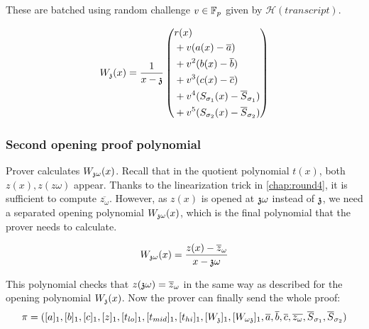 These are batched using random challenge $v \in \mathbb{F}_p$ given by $\mathcal{H}(transcript)$. 

$$W_{\mathfrak{z}}(x) = \frac{1}{x - \mathfrak{z}} \left(
\begin{aligned}
    &r(x)  \\
    &+ v(a(x) - \overline{a}) \\ 
    &+ v^2(b(x) - \overline{b}) \\ 
    &+ v^3(c(x) - \overline{c}) \\
    &+ v^4(S_{\sigma_1}(x) - \overline{S}_{\sigma_1}) \\ 
    &+ v^5(S_{\sigma_2}(x) - \overline{S}_{\sigma_2}) 
\end{aligned}
\right)$$


\subsubsection{Second opening proof polynomial}
Prover calculates $W_{\mathfrak{z}\omega}(x)$. Recall that in the quotient polynomial $t(x)$, both $z(x), z(z\omega)$ appear. Thanks to the linearization trick in \eqref{chap:round4}, it is sufficient to compute $\overline{z_\omega}$. However, as $z(x)$ is opened at $\mathfrak{z}\omega$ instead of $\mathfrak{z}$, we need a separated opening polynomial $W_{\mathfrak{z}\omega}(x)$, which is the final polynomial that the prover needs to calculate.

$$W_{\mathfrak{z}\omega}(x) = \frac{z(x)-\overline{z}_{\omega}}{x - \mathfrak{z}\omega}$$

This polynomial checks that $z(\mathfrak{z}\omega) = \overline{z}_\omega$ in the same way as described for the opening polynomial $W_{\mathfrak{z}}(x)$. Now the prover can finally send the whole proof:
$$\pi = ([a]_1, [b]_1, [c]_1, [z]_1, [t_{lo}]_1, [t_{mid}]_1, [t_{hi}]_1, [W_{\mathfrak{z}}]_1, [W_{\omega\mathfrak{z}}]_1, \overline{a}, \overline{b}, \overline{c}, \overline{z_\omega}, \overline{S}_{\sigma_1}, \overline{S}_{\sigma_2})$$


